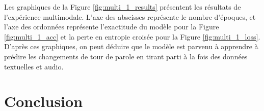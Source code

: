 \documentclass[a4paper]{article}
\begin{document}
Les graphiques de la Figure \ref{fig:multi_1_results} présentent les résultats de l'expérience multimodale. L'axe des abscisses représente le nombre d'époques, et l'axe des ordonnées représente l'exactitude du modèle pour la Figure \ref{fig:multi_1_acc} et la perte en entropie croisée pour la Figure \ref{fig:multi_1_loss}.
D'après ces graphiques, on peut déduire que le modèle est parvenu à apprendre à prédire les changements de tour de parole en tirant parti à la fois des données textuelles et audio.
\section{Conclusion}

\end{document}
